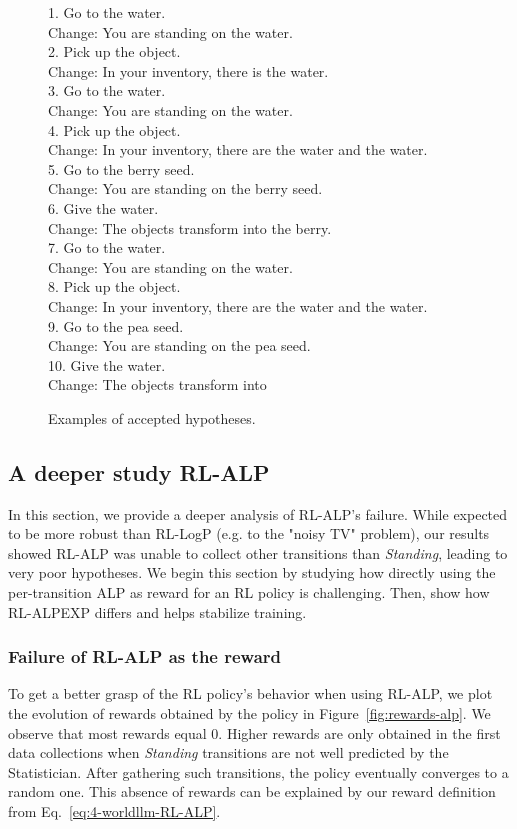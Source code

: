 \documentclass{article}
\begin{document}
\begin{figure}[hbt]
\begin{promptbox}{}
{    1. Go to the water.\\Change: You are standing on the water.\\2. Pick up the object.\\Change: In your inventory, there is the water.\\3. Go to the water.\\Change: You are standing on the water.\\4. Pick up the object.\\Change: In your inventory, there are the water and the water.\\5. Go to the berry seed.\\Change: You are standing on the berry seed.\\6. Give the water.\\Change: The objects transform into the berry.\\7. Go to the water.\\Change: You are standing on the water.\\8. Pick up the object.\\Change: In your inventory, there are the water and the water.\\9. Go to the pea seed.\\Change: You are standing on the pea seed.\\10. Give the water.\\Change: The objects transform into
    }
\end{promptbox}
\caption{Examples of accepted hypotheses.}
\label{fig:hypotheses_examples}
\end{figure}

\subsection{A deeper study RL-ALP}
In this section, we provide a deeper analysis of RL-ALP's failure. While expected to be more robust than RL-LogP (e.g. to the "noisy TV" problem), our results showed RL-ALP was unable to collect other transitions than \textit{Standing}, leading to very poor hypotheses. We begin this section by studying how directly using the per-transition ALP as reward for an RL policy is challenging. Then, show how RL-ALPEXP differs and helps stabilize training.

\subsubsection{Failure of RL-ALP as the reward}\label{app:rl-alp-failed}
To get a better grasp of the RL policy's behavior when using RL-ALP, we plot the evolution of rewards obtained by the policy in Figure~\ref{fig:rewards-alp}. We observe that most rewards equal $0$. Higher rewards are only obtained in the first data collections when \textit{Standing} transitions are not well predicted by the Statistician. After gathering such transitions, the policy eventually converges to a random one. This absence of rewards can be explained by our reward definition from Eq.~\ref{eq:4-worldllm-RL-ALP}.
\end{document}
